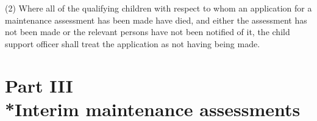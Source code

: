 \documentclass[a4paper]{article}
\newcommand{\parthead}{}
\begin{document}
(2) Where all of the qualifying children with respect to whom an application for a maintenance assessment has been made have died, and either the assessment has not been made or the relevant persons have not been notified of it, the child support officer shall treat the application as not having being made.

\section[Part III --- Interim maintenance assessments]{Part III\\*Interim maintenance assessments}

\renewcommand\parthead{--- Part III}

%
%
%
%
\end{document}
